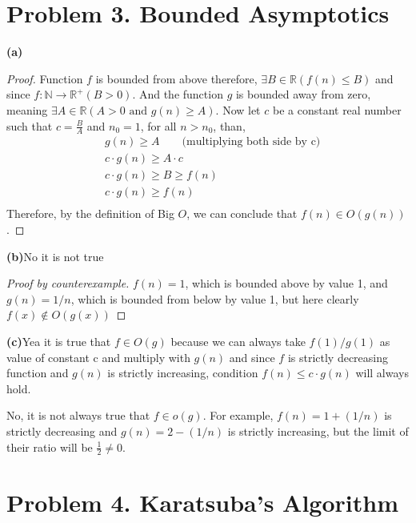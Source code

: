 \documentclass{article}
\begin{document}
\section*{Problem 3. Bounded Asymptotics}

\textbf{(a)}
\begin{proof}
Function $f$ is bounded from above therefore, $\exists B \in \mathbb{R}(f(n) \leq B)$ and since $f:\mathbb{N} \rightarrow \mathbb{R}^+ (B > 0)$.
And the function $g$ is bounded away from zero, meaning $\exists A \in \mathbb{R} (A > 0 \text{ and } g(n) \geq A)$.
Now let $c$ be a constant real number such that $c = \frac{B}{A}$ and $n_0 = 1$, for all $n > n_0$, than,
\[
\begin{aligned}
&g(n) \geq A \qquad \text{(multiplying both side by c)} \\
&c \cdot g(n) \geq A \cdot c \\
&c \cdot g(n) \geq B \geq f(n) \\
&c \cdot g(n) \geq f(n) \\
\end{aligned}
\]
Therefore, by the definition of Big $O$, we can conclude that $f(n) \in O(g(n))$.
\end{proof}

\vspace{\baselineskip}
\noindent\textbf{(b)}No it is not true

\begin{proof}[Proof by counterexample]
$f(n) = 1$, which is bounded above by value 1, and $g(n) = 1/n$, which is bounded from below by value 1, but here clearly $f(x) \notin O(g(x))$
\end{proof}

\vspace{\baselineskip}
\noindent\textbf{(c)}Yea it is true that $f \in O(g)$ because we can always take $f(1)/g(1)$ as value of constant c and multiply with $g(n)$ and since $f$ is strictly decreasing
function and $g(n)$ is strictly increasing, condition $f(n) \leq c \cdot g(n)$ will always hold.

No, it is not always true that $f \in o(g)$. For example, $f(n) = 1 + (1/n)$ is strictly decreasing and $g(n) = 2 - (1/n)$ is strictly increasing, but the limit of their ratio will be $\frac{1}{2} \neq 0$.

\section*{Problem 4. Karatsuba's Algorithm}
\end{document}
